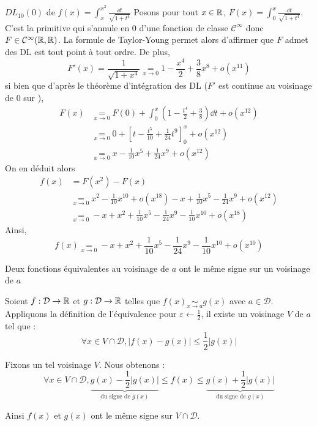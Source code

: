 \documentclass{article}
\begin{document}
\begin{question_kholle}{$DL_{10}(0)$ de $f(x)=\displaystyle\int_{x}^{x^{2}}\frac{\dd t}{\sqrt{1+t^{4}}}$}
	Posons pour tout $x\in\mathbb R$, $F(x)=\int_{0}^{x}\frac{\dd t}{\sqrt{1+t^{4}}}$. C’est la primitive qui s’annule en $0$ d’une fonction de classe $\mathcal{C}^{\infty}$ donc $F\in \mathcal{C}^{\infty}(\mathbb R, \mathbb R)$. La formule de Taylor-Young permet alors d’affirmer que $F$ admet des DL est tout point à tout ordre. De plus,
	\[
		F'(x) = \frac{1}{\sqrt{1+x^{4}}} \underset{x\to 0}{=} 1-\frac{x^{4}}{2} + \frac{3}{8}x^{8}+o(x^{11})
	\]
	si bien que d’après le théorème d’intégration des DL ($F'$ est continue au voisinage de 0 sur \R),
	\begin{align*}
		F(x) & \underset{x\to 0}{=} F(0)+\int_{0}^{x}\left(1-\frac{t^{4}}{2}+\frac{3}{8}\right)\dd t + o(x^{12}) \\
		     & \underset{x\to 0}{=} 0+\left[t-\frac{t^{5}}{10} + \frac{1}{24}t^{9}\right]_{0}^{x} + o(x^{12})    \\
		     & \underset{x\to 0}{=} x-\frac{1}{10}x^{5} + \frac{1}{24}x^{9} + o(x^{12})
	\end{align*}
	On en déduit alors
	\begin{align*}
		f(x) & = F(x^{2}) - F(x)                                                                                              \\
		     & \underset{x\to 0}{=} x^{2}-\frac{1}{10}x^{10} + o(x^{18}) - x+\frac{1}{10}x^{5} -\frac{1}{24}x^{9} + o(x^{12}) \\
		     & \underset{x\to 0}{=} -x+x^{2}+\frac{1}{10}x^{5}-\frac{1}{24}x^{9}-\frac{1}{10}x^{10}+o(x^{18})
	\end{align*}
	Ainsi,
	\[
		f(x)\underset{x\to 0}{=} -x+x^{2}+\frac{1}{10}x^{5} - \frac{1}{24}x^{9} - \frac{1}{10}x^{10} + o(x^{10})
	\]
\end{question_kholle}

\begin{question_kholle}
	{Deux fonctions équivalentes au voisinage de $a$ ont le même signe sur un voisinage de $a$}

	Soient $f : \mathcal{D} \rightarrow \mathbb R$ et $g : \mathcal{D} \rightarrow \mathbb R$ telles que $f(x) \underset{x \rightarrow a}{\sim} g(x)$ avec $a \in \mathcal{D}$. \\
	Appliquons la définition de l'équivalence pour $\varepsilon \leftarrow \frac{1}{2}$, il existe un voisinage $V$ de $a$ tel que :
	\begin{equation*}
		\forall x \in V \cap \mathcal{D},
		| f(x) - g(x) | \leqslant \frac{1}{2} | g(x) |
	\end{equation*}

	Fixons un tel voisinage $V$.
	Nous obtenons :
	\begin{equation*}
		\forall x \in V \cap \mathcal{D},
		\underbrace{g(x) - \frac{1}{2} | g(x) |}_{\text{du signe de }g(x)}
		\leqslant f(x) \leqslant
		\underbrace{g(x) + \frac{1}{2} | g(x) |}_{\text{du signe de }g(x)}
	\end{equation*}

	Ainsi $f(x)$ et $g(x)$ ont le même signe sur $V \cap \mathcal{D}$.
\end{question_kholle}
\end{document}
